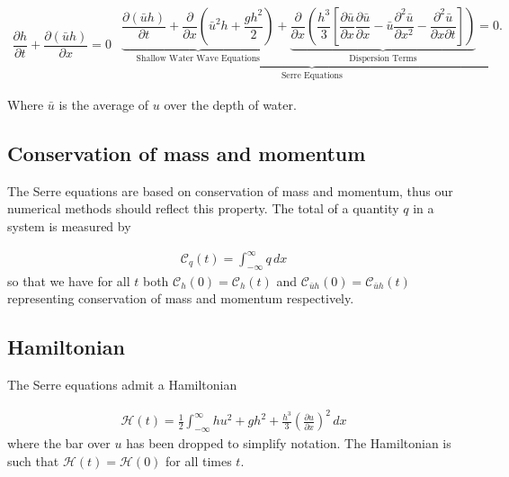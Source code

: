 \documentclass[SingleSpace,12pt,Journal]{Serre_ASCE}
\begin{document}
\begin{linenomath*}
\begin{subequations}\label{eq:Serre_nonconservative_form}
\begin{gather}
\dfrac{\partial h}{\partial t} + \dfrac{\partial (\bar{u}h)}{\partial x} = 0
\label{eq:Serre_continuity}
\end{gather}
\begin{gather}
\underbrace{\underbrace{\dfrac{\partial (\bar{u}h)}{\partial t} + \dfrac{\partial}{\partial x} \left ( \bar{u}^2h + \dfrac{gh^2}{2}\right )}_{\text{Shallow Water Wave Equations}} + \underbrace{\dfrac{\partial}{\partial x} \left (  \dfrac{h^3}{3} \left [ \dfrac{\partial \bar{u} }{\partial x} \dfrac{\partial \bar{u}}{\partial x} - \bar{u} \dfrac{\partial^2 \bar{u}}{\partial x^2}  - \dfrac{\partial^2 \bar{u}}{\partial x \partial t}\right ] \right )}_{\text{Dispersion Terms}} = 0.}_{\text{Serre Equations}}
\label{eq:Serre_momentum}
\end{gather}
\end{subequations}
\end{linenomath*}
Where $\bar{u}$ is the average of $u$ over the depth of water. 
\subsection{Conservation of mass and momentum}
The Serre equations are based on conservation of mass and momentum, thus our numerical methods should reflect this property. The total of a quantity $q$ in a system is measured by

\begin{gather}
\label{eqn:Condef}
\mathcal{C}_q(t) = \int_{-\infty}^{\infty} q\, dx
\end{gather}
so that we have for all $t$ both $\mathcal{C}_{h}(0) = \mathcal{C}_{h}(t)$ and $\mathcal{C}_{\bar{u}h}(0) = \mathcal{C}_{\bar{u}h}(t)$ representing conservation of mass and momentum respectively.

\subsection{Hamiltonian}

The Serre equations admit a Hamiltonian \cite{Li-Y-2002,Hank-etal-2010-2034,Green-Naghdi-1976-237}

\begin{gather}
\label{eqn:Hamildef}
\mathcal{H}(t) = \frac{1}{2}\int_{-\infty}^{\infty} hu^2 + gh^2 + \frac{h^3}{3} \left(\frac{\partial u}{\partial x}\right)^2\, dx
\end{gather}
where the bar over $u$ has been dropped to simplify notation. The Hamiltonian is such that $\mathcal{H}(t) = \mathcal{H}(0)$ for all times $t$.
\end{document}
